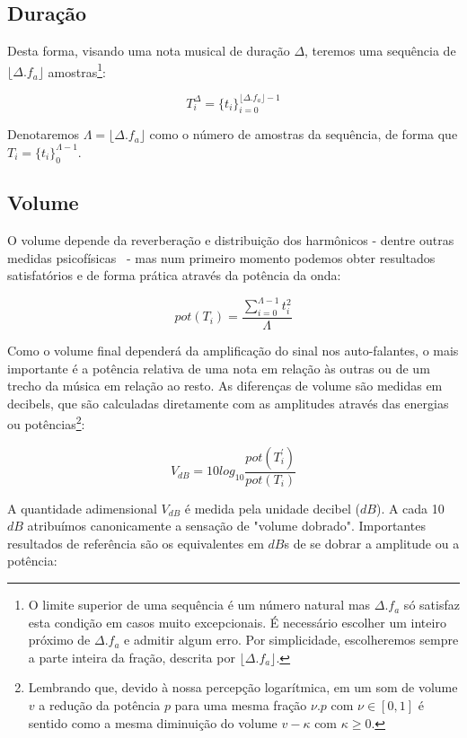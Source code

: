 \subsection{Duração}
Desta forma, visando uma nota musical de duração $\Delta$,
teremos uma sequência de $ \lfloor \Delta . f_a \rfloor $ amostras\footnote{O
limite superior de uma sequência é um número natural mas $ \Delta . f_a $
só satisfaz esta condição em casos muito excepcionais. É necessário
escolher um inteiro próximo de $\Delta . f_a$ e admitir algum erro. Por simplicidade,
escolheremos sempre a parte inteira da fração, descrita por $\lfloor \Delta . f_a \rfloor$.}:

\begin{equation}
T_{i}^{\Delta}={\{t_i\}}_{i=0}^{\lfloor \Delta . f_a \rfloor -1}
\end{equation}

Denotaremos $\Lambda = \lfloor \Delta . f_a \rfloor$ como o número de amostras da sequência, de forma que $T_i=\{t_i\}_0^{\Lambda-1}$.

\subsection{Volume}
O volume depende da reverberação e distribuição dos harmônicos - dentre outras medidas psicofísicas~\cite{Chowning} - mas num primeiro momento podemos obter resultados satisfatórios e de forma prática através da potência da onda:

\begin{equation}\label{potencia}
pot(T_i)=\frac{\sum_{i=0}^{\Lambda -1} t_i^2}{\Lambda}
\end{equation} 

Como o volume final dependerá da amplificação do sinal nos auto-falantes, o mais importante é a potência relativa de uma nota em relação às outras ou de um trecho da música em relação ao resto. As diferenças de volume são medidas em decibels, que são
calculadas diretamente com as amplitudes através das energias ou potências\footnote{Lembrando que, devido à nossa percepção logarítmica,
em um som de volume $v$ a redução da potência $p$ para uma mesma fração $\nu . p $ 
com $\nu \in [0,1]$ é sentido como a mesma diminuição do volume $v-\kappa$ com $\kappa \geq 0$.}:

\begin{equation}\label{decibels}
V_{dB}=10log_{10}\frac{pot(T^{'}_i)}{pot(T_i)}
\end{equation}

A quantidade adimensional $V_{dB}$ é medida pela unidade decibel ($dB$). A cada 10 $dB$ atribuímos canonicamente
a sensação de "volume dobrado". Importantes resultados de referência são os equivalentes em $dB$s de se dobrar
a amplitude ou a potência:

